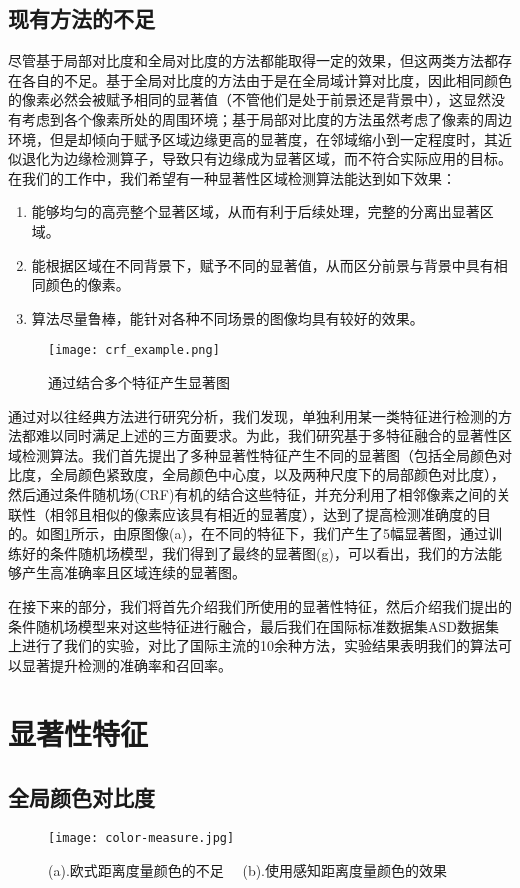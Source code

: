 \subsection{现有方法的不足}
尽管基于局部对比度和全局对比度的方法都能取得一定的效果，但这两类方法都存在各自的不足。基于全局对比度的方法由于是在全局域计算对比度，因此相同颜色的像素必然会被赋予相同的显著值（不管他们是处于前景还是背景中），这显然没有考虑到各个像素所处的周围环境；基于局部对比度的方法虽然考虑了像素的周边环境，但是却倾向于赋予区域边缘更高的显著度，在邻域缩小到一定程度时，其近似退化为边缘检测算子，导致只有边缘成为显著区域，而不符合实际应用的目标。在我们的工作中，我们希望有一种显著性区域检测算法能达到如下效果：
\begin{enumerate}
\item 能够均匀的高亮整个显著区域，从而有利于后续处理，完整的分离出显著区域。
\item 能根据区域在不同背景下，赋予不同的显著值，从而区分前景与背景中具有相同颜色的像素。
\item 算法尽量鲁棒，能针对各种不同场景的图像均具有较好的效果。
\end{enumerate}

\begin{figure}
\centering
\texttt{[image: crf\_example.png]}
\caption{通过结合多个特征产生显著图}\label{fig:crf_example}
\end{figure}

通过对以往经典方法进行研究分析，我们发现，单独利用某一类特征进行检测的方法都难以同时满足上述的三方面要求。为此，我们研究基于多特征融合的显著性区域检测算法。我们首先提出了多种显著性特征产生不同的显著图（包括全局颜色对比度，全局颜色紧致度，全局颜色中心度，以及两种尺度下的局部颜色对比度），然后通过条件随机场(CRF)有机的结合这些特征，并充分利用了相邻像素之间的关联性（相邻且相似的像素应该具有相近的显著度），达到了提高检测准确度的目的。如图\ref{fig:crf_example}所示，由原图像(a)，在不同的特征下，我们产生了5幅显著图，通过训练好的条件随机场模型，我们得到了最终的显著图(g)，可以看出，我们的方法能够产生高准确率且区域连续的显著图。

在接下来的部分，我们将首先介绍我们所使用的显著性特征，然后介绍我们提出的条件随机场模型来对这些特征进行融合，最后我们在国际标准数据集ASD数据集上进行了我们的实验，对比了国际主流的10余种方法，实验结果表明我们的算法可以显著提升检测的准确率和召回率。

\section{显著性特征}
\subsection{全局颜色对比度}
\begin{figure}[h]
\centering
\texttt{[image: color-measure.jpg]}
\caption{(a).欧式距离度量颜色的不足 ~~(b).使用感知距离度量颜色的效果}\label{fig:color_measure}
\end{figure}

